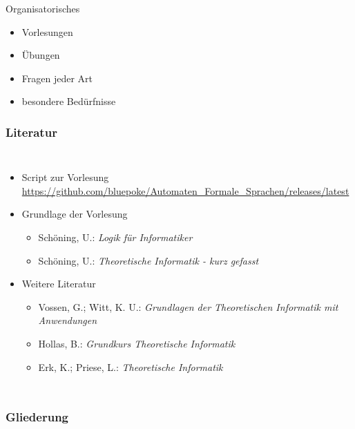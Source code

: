 \begin{frame}
	\titlepage
\end{frame}


\begin{frame}{Organisatorisches}
	\begin{itemize}
		\item Vorlesungen
		\item Übungen
		\item Fragen jeder Art
		\item besondere Bedürfnisse
	\end{itemize}
\end{frame}

\AtBeginSection{
	\begin{frame}
		\sectionpage
		\tableofcontents[sectionstyle=hide/hide,subsectionstyle=show/show/hide]
	\end{frame}
}

\begin{frame}
	\frametitle{Literatur}
	\begin{columns}
			\begin{itemize}
				\item Script zur Vorlesung \\
				{\small \url{https://github.com/bluepoke/Automaten_Formale_Sprachen/releases/latest}}
				\item Grundlage der Vorlesung
				\begin{itemize}
					\item Schöning, U.: \textit{Logik für Informatiker}
					\item Schöning, U.: \textit{Theoretische Informatik - kurz gefasst}
				\end{itemize}
				\item Weitere Literatur
				\begin{itemize}
					\item Vossen, G.; Witt, K. U.: \textit{Grundlagen der Theoretischen Informatik mit Anwendungen}
					\item Hollas, B.: \textit{Grundkurs Theoretische Informatik}
					\item Erk, K.;  Priese, L.: \textit{Theoretische Informatik}
				\end{itemize}
			\end{itemize}
	\end{columns}
\end{frame}

\begin{frame}
	\frametitle{Gliederung}
	\tableofcontents
\end{frame}
